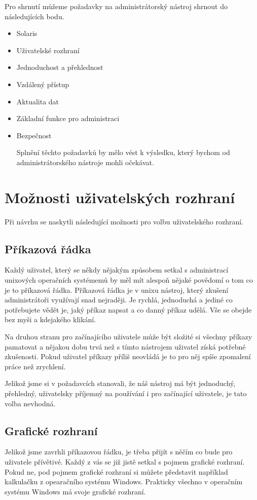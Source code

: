 Pro shrnutí můžeme požadavky na administrátorský nástroj shrnout do následujících bodu.
\begin{itemize}
    \item Solaris
    \item Uživatelské rozhraní
    \item Jednoduchost a přehlednost
    \item Vzdálený přístup
    \item Aktualita dat
    \item Základní funkce pro administraci
    \item Bezpečnost  
    
Splnění těchto požadavků by mělo vést k výsledku, který bychom od administrátorského nástroje mohli očekávat.
\end{itemize}
\section{Možnosti uživatelských rozhraní}
Při návrhu se naskytli následující možnosti pro volbu uživatelského rozhraní.
    \subsection{Příkazová řádka}
    Každý uživatel, který se někdy nějakým způsobem setkal s administrací unixových operačních systémemů by měl mít alespoň nějaké povědomí o tom co je to příkazová řádka. Příkazová řádka je v unixu nástroj, který zkušení administrátoři využívají snad nejraději. Je rychlá, jednoduchá a jediné co potřebujete vědět je, jaký příkaz napsat a co danný příkaz udělá. Vše se obejde bez myši a kdejakého klikání.
    
    Na druhou stranu pro začínajícího uživatele může být složité si všechny příkazy pamatovat a nějakou dobu trvá než s tímto nástrojem uživatel získá potřebné zkušenosti. Pokud uživatel příkazy příliš neovládá je to pro něj spíše zpomalení práce než zrychlení.
    
    Jelikož jsme si v požadavcích stanovali, že náš nástroj má být jednoduchý, přehledný, uživatelsky příjemný na používání i pro začínající uživatele, je tato volba nevhodná.
    \subsection{Grafické rozhraní}
    Jelikož jsme zavrhli příkazovou řádku, je třeba přijít s něčím co bude pro uživatele přívětivé. Každý z vás se již jistě setkal s pojmem grafické rozhraní. Pokud ne, pod pojmem grafické rozhraní si můžete představit například kalkulačku z opearačního systému Windows. Prakticky všechno v operačním systému Windows má svoje grafické rozhraní.
    
